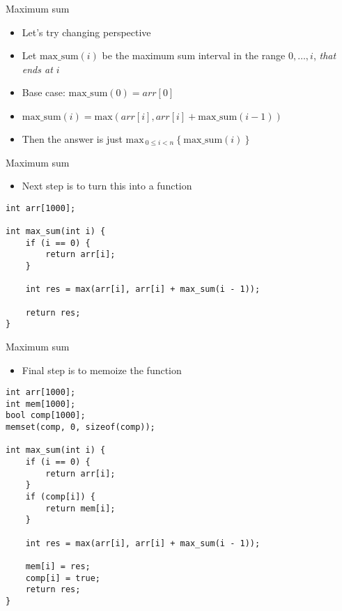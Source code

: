 \documentclass[12pt,t]{beamer}
\newcommand{\bi}{\begin{itemize}}
\newcommand{\ei}{\end{itemize}}
\begin{document}
\begin{frame}{Maximum sum}

    \vspace{20pt}

    \bi
        \item Let's try changing perspective
        \vspace{5pt}
    \item Let $\mathrm{max\_{}sum}(i)$ be the maximum sum interval in the range $0,\ldots,i$, \textit{that ends at $i$}
        \vspace{5pt}
        \item Base case: $\mathrm{max\_{}sum}(0) = arr[0]$
        \vspace{5pt}
    \item $\mathrm{max\_{}sum}(i) = \mathrm{max}(arr[i], arr[i] + \mathrm{max\_{}sum}(i - 1))$
        \vspace{15pt}
        \item Then the answer is just $\mathrm{max}_{\ 0 \leq i < n}\ \{\ \mathrm{max\_{}sum}(i)\ \}$
    \ei

\end{frame}

\begin{frame}[fragile]{Maximum sum}
    \bi
        \item Next step is to turn this into a function
    \ei

    \begin{verbatim}
int arr[1000];

int max_sum(int i) {
    if (i == 0) {
        return arr[i];
    }

    int res = max(arr[i], arr[i] + max_sum(i - 1));

    return res;
}
    \end{verbatim}
\end{frame}

\begin{frame}[fragile]{Maximum sum}
    \bi
        \item Final step is to memoize the function
    \ei

    \begin{verbatim}
int arr[1000];
int mem[1000];
bool comp[1000];
memset(comp, 0, sizeof(comp));

int max_sum(int i) {
    if (i == 0) {
        return arr[i];
    }
    if (comp[i]) {
        return mem[i];
    }

    int res = max(arr[i], arr[i] + max_sum(i - 1));

    mem[i] = res;
    comp[i] = true;
    return res;
}
    \end{verbatim}
\end{frame}
\end{document}
